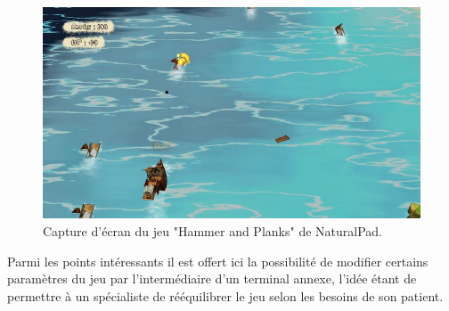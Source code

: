 \begin{figure}[h!]
\centering
\includegraphics[width=1.0\linewidth]{../images/hammer_and_planks}
\caption{Capture d'écran du jeu "Hammer and Planks" de 
NaturalPad.}
\label{fig:hammer_planks}
\end{figure}

Parmi les points intéressants il est offert ici la possibilité de modifier certains
paramètres du jeu par l'intermédiaire d'un terminal annexe, l'idée étant de
permettre à un spécialiste de rééquilibrer le jeu selon les besoins de son
patient.

